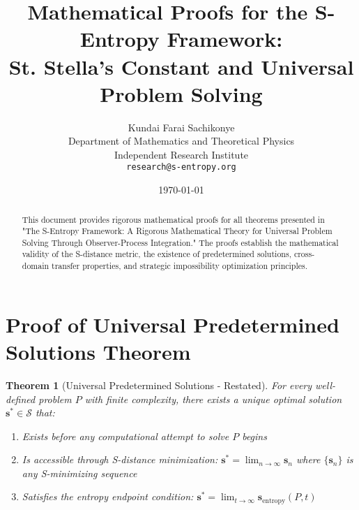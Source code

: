 \documentclass[12pt,a4paper]{article}
\title{Mathematical Proofs for the S-Entropy Framework: \\St. Stella's Constant and Universal Problem Solving}
\author{Kundai Farai Sachikonye\\
Department of Mathematics and Theoretical Physics\\
Independent Research Institute\\
\texttt{research@s-entropy.org}}
\date{\today}
\newtheorem{theorem}{Theorem}
\begin{document}
\maketitle

\begin{abstract}
This document provides rigorous mathematical proofs for all theorems presented in "The S-Entropy Framework: A Rigorous Mathematical Theory for Universal Problem Solving Through Observer-Process Integration." The proofs establish the mathematical validity of the S-distance metric, the existence of predetermined solutions, cross-domain transfer properties, and strategic impossibility optimization principles.
\end{abstract}

\section{Proof of Universal Predetermined Solutions Theorem}
\label{proof:predetermined_solutions}

\begin{theorem}[Universal Predetermined Solutions - Restated]
For every well-defined problem $P$ with finite complexity, there exists a unique optimal solution $\mathbf{s}^* \in \mathcal{S}$ that:
\begin{enumerate}
\item Exists before any computational attempt to solve $P$ begins
\item Is accessible through S-distance minimization: $\mathbf{s}^* = \lim_{n \to \infty} \mathbf{s}_n$ where $\{\mathbf{s}_n\}$ is any S-minimizing sequence
\item Satisfies the entropy endpoint condition: $\mathbf{s}^* = \lim_{t \to \infty} \mathbf{s}_{\text{entropy}}(P, t)$
\end{enumerate}
\end{theorem}
\end{document}
